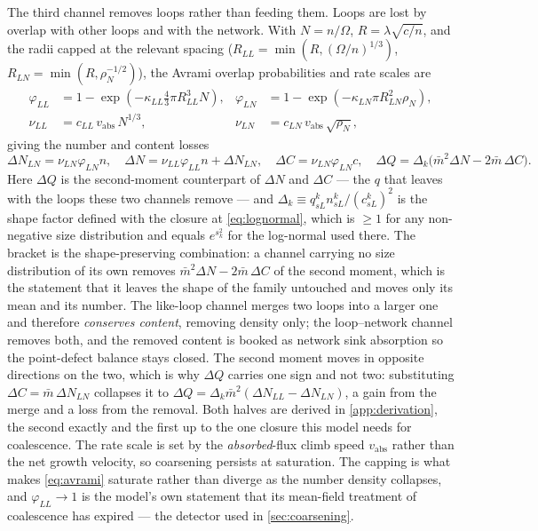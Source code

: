The third channel removes loops rather than feeding them. Loops are lost by
overlap with other loops and with
the network. With $N=n/\Omega$, $R=\lambda\sqrt{c/n}$, and the radii capped at
the relevant spacing ($R_{LL}=\min(R,(\Omega/n)^{1/3})$,
$R_{LN}=\min(R,\rho_N^{-1/2})$), the Avrami overlap probabilities and rate
scales are
\begin{align}
  \varphi_{LL}&=1-\exp\!\left(-\kappa_{LL}\tfrac43\pi R_{LL}^{3}N\right), &
  \varphi_{LN}&=1-\exp\!\left(-\kappa_{LN}\pi R_{LN}^{2}\rho_N\right),
  \nonumber\\
  \nu_{LL}&=c_{LL}\,v_{\mathrm{abs}}\,N^{1/3}, &
  \nu_{LN}&=c_{LN}\,v_{\mathrm{abs}}\,\sqrt{\rho_N},
  \label{eq:avrami}
\end{align}
giving the number and content losses
\begin{equation}
  \Delta N_{LN}=\nu_{LN}\varphi_{LN}n,
  \quad
  \Delta N=\nu_{LL}\varphi_{LL}n+\Delta N_{LN},
  \quad
  \Delta C=\nu_{LN}\varphi_{LN}c,
  \quad
  \Delta Q=\Delta_k\bigl(\bar m^{2}\Delta N-2\bar m\,\Delta C\bigr).
  \label{eq:coal}
\end{equation}
Here $\Delta Q$ is the second-moment counterpart of $\Delta N$ and
$\Delta C$ --- the $q$ that leaves with the loops these two channels remove ---
and $\Delta_k\equiv q^k_{sL}n^k_{sL}/(c^k_{sL})^{2}$ is the shape factor defined
with the closure at \cref{eq:lognormal}, which is $\ge1$ for any non-negative
size distribution and equals $e^{s_k^{2}}$ for the log-normal used there. The
bracket is the shape-preserving combination: a channel carrying no size
distribution of its own removes $\bar m^{2}\Delta N-2\bar m\,\Delta C$ of the
second moment, which is the statement that it leaves the shape of the family
untouched and moves only its mean and its number. The like-loop channel merges
two loops into a larger one and therefore \emph{conserves content}, removing
density only; the loop--network channel
removes both, and the removed content is booked as network sink absorption so
the point-defect balance stays closed. The second moment moves in opposite
directions on the two, which is why $\Delta Q$ carries one sign and not two:
substituting $\Delta C=\bar m\,\Delta N_{LN}$ collapses it to
$\Delta Q=\Delta_k\bar m^{2}(\Delta N_{LL}-\Delta N_{LN})$, a gain from the
merge and a loss from the removal. Both halves are derived in
\cref{app:derivation}, the second exactly and the first up to the one closure
this model needs for coalescence. The rate scale is set by the
\emph{absorbed}-flux climb speed $v_{\mathrm{abs}}$ rather than the net growth
velocity, so coarsening persists at saturation. The capping is what makes
\cref{eq:avrami} saturate rather than diverge as the number density collapses,
and $\varphi_{LL}\to1$ is the model's own statement that its mean-field
treatment of coalescence has expired --- the detector used in
\cref{sec:coarsening}.

